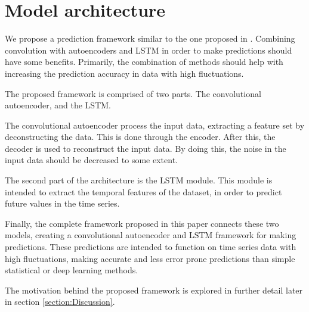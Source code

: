 \section{Model architecture}
\label{section:Architecture:Model}


We propose a prediction framework similar to the one proposed in \cite{Zhao2019}.
Combining convolution with autoencoders and LSTM in order to make predictions should have some benefits.
Primarily, the combination of methods should help with increasing the prediction accuracy in data with high fluctuations.

The proposed framework is comprised of two parts.
The convolutional autoencoder, and the LSTM.


The convolutional autoencoder process the input data, extracting a feature set by deconstructing the data.
This is done through the encoder. After this, the decoder is used to reconstruct the input data.
By doing this, the noise in the input data should be decreased to some extent.

The second part of the architecture is the LSTM module.
This module is intended to extract the temporal features of the dataset,
in order to predict future values in the time series.


Finally, the complete framework proposed in this paper connects these two models,
creating a convolutional autoencoder and LSTM framework for making predictions.
These predictions are intended to function on time series data with high fluctuations,
making accurate and less error prone predictions than simple statistical or deep learning methods.

The motivation behind the proposed framework is explored in further detail later in section \ref{section:Discussion}.

